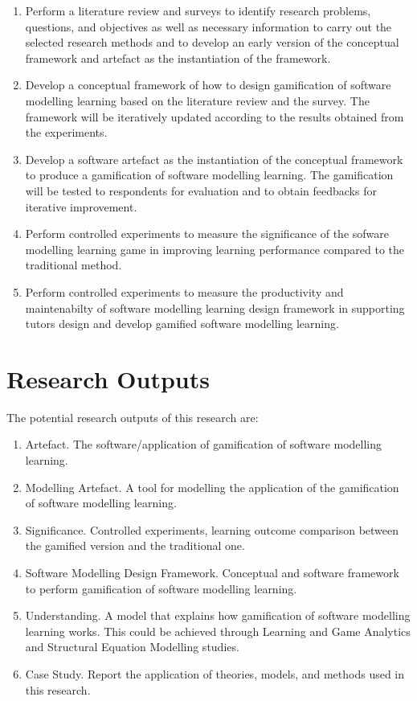 \documentclass[a4paper]{Report}
\begin{document}
\begin{enumerate}
\item Perform a literature review and surveys to identify research problems, questions, and objectives as well as necessary information to carry out the selected research methods and to develop an early version of the conceptual framework and artefact as the instantiation of the framework. 
\item Develop a conceptual framework of how to design gamification of software modelling learning based on the literature review and the survey. The framework will be iteratively updated according to the results obtained from the experiments. 
\item Develop a software artefact as the instantiation of the conceptual framework to produce a gamification of software modelling learning. The gamification will be tested to respondents for evaluation and to obtain feedbacks for iterative improvement. 
\item Perform controlled experiments to measure the significance of the sofware modelling learning game in improving learning performance compared to the traditional method.
\item Perform controlled experiments to measure the productivity and maintenabilty of software modelling learning design framework in supporting tutors design and develop gamified software modelling learning. 
\end{enumerate}

\section{Research Outputs}
The potential research outputs of this research are:
\begin{enumerate}
\item Artefact. The software/application of gamification of software modelling learning.
\item Modelling Artefact. A tool for modelling the application of the gamification of software modelling learning.
\item Significance. Controlled experiments, learning outcome comparison between the gamified version and the traditional one.
\item Software Modelling Design Framework. Conceptual and software framework to perform gamification of software modelling learning.
\item Understanding. A model that explains how gamification of software modelling learning works.
This could be achieved through Learning and Game Analytics and Structural Equation Modelling studies.
\item Case Study. Report the application of theories, models, and methods used in this research.
\end{enumerate}
\end{document}
